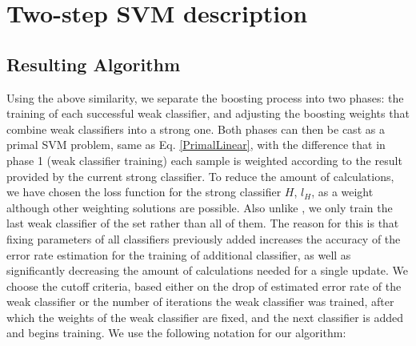 
\chapter{Two-step SVM description} %
\section{Resulting Algorithm}

Using the above similarity, we separate the boosting process into two phases: the training of each successful weak classifier, and adjusting the boosting weights that combine weak classifiers into a strong one. Both phases can then be cast as a primal SVM problem, same as Eq. \ref{PrimalLinear}, with the difference that in phase 1 (weak classifier training) each sample is weighted according to the result provided by the current strong classifier. To reduce the amount of calculations, we have chosen the loss function for the strong classifier $H$, $l_H$, as a weight although other weighting solutions are possible. Also unlike \cite{OnlineBoost}, we only train the last weak classifier of the set rather than all of them. The reason for this is that fixing parameters of all classifiers previously added  increases the accuracy of the error rate estimation for the training of additional classifier,  as well as significantly decreasing the amount of calculations needed for a single update. We choose the cutoff criteria, based either on the drop of estimated error rate of the weak classifier or the number of iterations the weak classifier was trained, after which the weights of the weak classifier are fixed, and the next classifier is added and begins training.
We use the following notation for our algorithm:


\ifpdf
    \graphicspath{{X/figures/PNG/}{X/figures/PDF/}{X/figures/}}
\else
    \graphicspath{{X/figures/EPS/}{X/figures/}}
\fi









